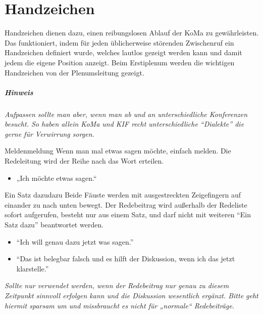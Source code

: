 \chapter{Handzeichen}\label{sec:handzeichen}

Handzeichen dienen dazu, einen reibungslosen Ablauf der KoMa zu gewährleisten.
Das funktioniert, indem für jeden üblicherweise störenden Zwischenruf ein Handzeichen definiert wurde, welches lautlos gezeigt werden kann und damit jedem die eigene Position anzeigt.
Beim Erstiplenum werden die wichtigen Handzeichen von der Plenumsleitung gezeigt.

\paragraph{Hinweis} \emph{Aufpassen sollte man aber, wenn man ab und an unterschiedliche Konferenzen besucht. So haben allein KoMa und KIF recht unterschiedliche \enquote{Dialekte} die gerne für Verwirrung sorgen.}

\begin{handzeichen}[.2\linewidth]{Melden}{meldung}
Wenn man mal etwas sagen möchte, einfach melden. Die Redeleitung wird der Reihe nach das Wort erteilen.
\begin{itemize}
	\item „Ich möchte etwas sagen.“
\end{itemize}
\end{handzeichen}

\begin{handzeichen}{Ein Satz dazu}{dazu}
Beide Fäuste werden mit ausgestreckten Zeigefingern auf einander zu nach unten bewegt.
Der Redebeitrag wird außerhalb der Redeliste sofort aufgerufen, besteht nur aus einem Satz, und darf nicht mit weiteren \enquote{Ein Satz dazu} beantwortet werden. 
\begin{itemize}
	\item \enquote{Ich will genau dazu jetzt was sagen.}
	\item \enquote{Das ist belegbar falsch und es hilft der Diskussion, wenn ich das jetzt klarstelle.}
\end{itemize}
\end{handzeichen}

\emph{Sollte nur verwendet werden, wenn der Redebeitrag nur genau zu diesem Zeitpunkt sinnvoll erfolgen kann und die Diskussion wesentlich ergänzt. Bitte geht hiermit sparsam um und missbraucht es nicht für „normale“ Redebeiträge.}

